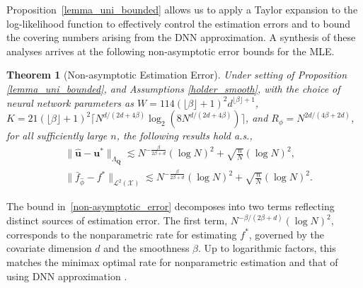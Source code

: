 \documentclass[
  12pt]{article}
\newtheorem{theorem}{Theorem}[section]
\begin{document}
Proposition~\ref{lemma_uni_bounded} allows us to apply a Taylor expansion to the log-likelihood function to effectively control the estimation errors and to bound the covering numbers arising from the DNN approximation. A synthesis of these analyses arrives at the following non-asymptotic error bounds for the MLE.



\begin{theorem}[Non-asymptotic Estimation Error]\label{thm:consistency}
Under setting of Proposition \ref{lemma_uni_bounded}, and Assumptions \ref{holder_smooth}, with the choice of neural network parameters as 
$W =114(\lfloor\beta\rfloor+1)^2 d^{\lfloor\beta\rfloor+1} $, $K = 21(\lfloor\beta\rfloor+1)^2\lceil N^{d/(2d+4\beta)} \log _2(8 N^{d/(2d+4\beta)})\rceil$, and $R_\phi=N^{2d/(4\beta+2d)}$, for all sufficiently large $n$, the following results hold a.s.,
\begin{equation}\label{non-asymptotic_error}
\begin{aligned}
    &\|\widehat{\boldsymbol{u}}-\boldsymbol{u}^*\|_{\Lambda_{\boldsymbol{Q}}} \lesssim N^{-\frac{\beta}{2\beta +d}} (\log N)^2 + \sqrt{\frac{n}{N}} (\log N)^2,\\
    &\|\bar{f}_{\widehat{\phi}}-f^*\|_{\mathcal{L}^2(\mathcal{X})} \lesssim N^{-\frac{\beta}{2\beta +d}} (\log N)^2 + \sqrt{\frac{n}{N}} (\log N)^2. 
\end{aligned}\end{equation}
\end{theorem}


The bound in~\eqref{non-asymptotic_error} decomposes into two terms reflecting distinct sources of estimation error. The first term, $N^{-\beta/(2\beta+d)}(\log N)^2$, corresponds to the nonparametric rate for estimating $f^*$, governed by the covariate dimension $d$ and the smoothness $\beta$. Up to logarithmic factors, this matches the minimax optimal rate for nonparametric estimation \cite[Theorem 1]{stone1982optimal} and that of using DNN approximation \cite[Theorem 1 \& 3]{schmidt2020nonparametric}. 
\end{document}
